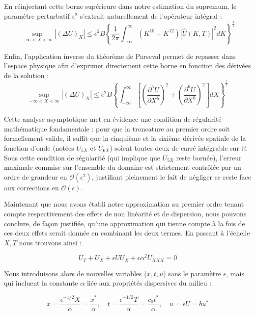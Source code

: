 En réinjectant cette borne supérieure dans notre estimation du supremum, le paramètre perturbatif $\epsilon^2$ s'extrait naturellement de l'opérateur intégral :
\[
\sup_{-\infty<X<\infty}|(\Delta U)_{X}| \le \epsilon^{2}B\left\{\frac{1}{2\pi}\int_{-\infty}^{\infty}(K^{10}+K^{12})|\hat{U}(K,T)|^{2}dK\right\}^{\frac{1}{2}}
\]

Enfin, l'application inverse du théorème de Parseval permet de repasser dans l'espace physique afin d'exprimer directement cette borne en fonction des dérivées de la solution :
\[
\sup_{-\infty<X<\infty}|(\Delta U)_{X}| \le \epsilon^{2}B\left\{\int_{-\infty}^{\infty}\left[\left(\frac{\partial^5 U}{\partial X^5}\right)^2 + \left(\frac{\partial^6 U}{\partial X^6}\right)^2\right]dX\right\}^{\frac{1}{2}}
\]

Cette analyse asymptotique met en évidence une condition de régularité mathématique fondamentale : pour que la troncature au premier ordre soit formellement valide, il suffit que la cinquième et la sixième dérivée spatiale de la fonction d'onde (notées $U_{5X}$ et $U_{6X}$) soient toutes deux de carré intégrable sur $\mathbb{R}$. Sous cette condition de régularité (qui implique que $U_{5X}$ reste bornée), l'erreur maximale commise sur l'ensemble du domaine est strictement contrôlée par un ordre de grandeur en $\mathcal{O}(\epsilon^2)$, justifiant pleinement le fait de négliger ce reste face aux corrections en $\mathcal{O}(\epsilon)$.








Maintenant que nous avons établi notre approximation au premier ordre tenant compte respectivement des effets de non linéarité et de dispersion, nous pouvons conclure, de façon justifiée, qu'une approximation qui tienne compte à la fois de ces deux effets serait donnée en combinant les deux termes. En passant à l'échelle $X, T$ nous trouvons ainsi :

\begin{equation}\label{eq:KDV_XY}
    U_T + U_X + \epsilon U U_X + \epsilon \alpha^2 U_{XXX} = 0
\end{equation}

Nous introduisons alors de nouvelles variables ($x, t, u$) sans le paramètre $\epsilon$, mais qui incluent la constante $\alpha$ liée aux propriétés dispersives du milieu :

\begin{equation}
    x = \frac{\epsilon^{-1/2}X}{\alpha} = \frac{x^*}{\alpha}, \quad t = \frac{\epsilon^{-1/2}T}{\alpha} = \frac{c_0 t^*}{\alpha}, \quad u = \epsilon U = b u^*
\end{equation}

